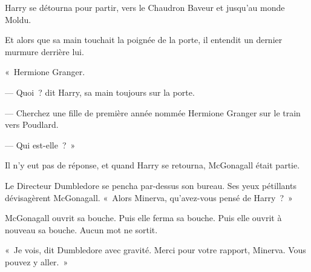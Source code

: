 Harry se détourna pour partir, vers le Chaudron Baveur et jusqu'au monde Moldu.

Et alors que sa main touchait la poignée de la porte, il entendit un dernier murmure derrière lui.

«~Hermione Granger.

--- Quoi~? dit Harry, sa main toujours sur la porte.

--- Cherchez une fille de première année nommée Hermione Granger sur le train vers Poudlard.

--- Qui est-elle~?~»

Il n'y eut pas de réponse, et quand Harry se retourna, McGonagall était partie.


Le Directeur Dumbledore se pencha par-dessus son bureau. Ses yeux pétillants dévisagèrent McGonagall. «~Alors Minerva, qu'avez-vous pensé de Harry~?~»

McGonagall ouvrit sa bouche. Puis elle ferma sa bouche. Puis elle ouvrit à nouveau sa bouche. Aucun mot ne sortit.

«~Je vois, dit Dumbledore avec gravité. Merci pour votre rapport, Minerva. Vous pouvez y aller.~»

